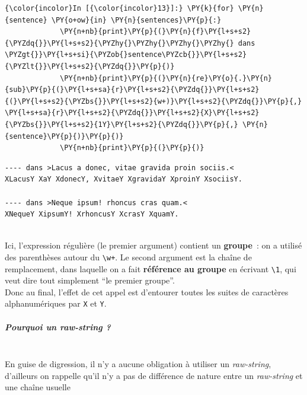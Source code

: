     \begin{Verbatim}[commandchars=\\\{\}]
{\color{incolor}In [{\color{incolor}13}]:} \PY{k}{for} \PY{n}{sentence} \PY{o+ow}{in} \PY{n}{sentences}\PY{p}{:}
             \PY{n+nb}{print}\PY{p}{(}\PY{n}{f}\PY{l+s+s2}{\PYZdq{}}\PY{l+s+s2}{\PYZhy{}\PYZhy{}\PYZhy{}\PYZhy{} dans \PYZgt{}}\PY{l+s+si}{\PYZob{}sentence\PYZcb{}}\PY{l+s+s2}{\PYZlt{}}\PY{l+s+s2}{\PYZdq{}}\PY{p}{)}
             \PY{n+nb}{print}\PY{p}{(}\PY{n}{re}\PY{o}{.}\PY{n}{sub}\PY{p}{(}\PY{l+s+sa}{r}\PY{l+s+s2}{\PYZdq{}}\PY{l+s+s2}{(}\PY{l+s+s2}{\PYZbs{}}\PY{l+s+s2}{w+)}\PY{l+s+s2}{\PYZdq{}}\PY{p}{,} \PY{l+s+sa}{r}\PY{l+s+s2}{\PYZdq{}}\PY{l+s+s2}{X}\PY{l+s+s2}{\PYZbs{}}\PY{l+s+s2}{1Y}\PY{l+s+s2}{\PYZdq{}}\PY{p}{,} \PY{n}{sentence}\PY{p}{)}\PY{p}{)}
             \PY{n+nb}{print}\PY{p}{(}\PY{p}{)}
\end{Verbatim}


    \begin{Verbatim}[commandchars=\\\{\}]
---- dans >Lacus a donec, vitae gravida proin sociis.<
XLacusY XaY XdonecY, XvitaeY XgravidaY XproinY XsociisY.

---- dans >Neque ipsum! rhoncus cras quam.<
XNequeY XipsumY! XrhoncusY XcrasY XquamY.


    \end{Verbatim}

    Ici, l'expression régulière (le premier argument) contient un
\textbf{groupe}~: on a utilisé des parenthèses autour du
\texttt{\textbackslash{}w+}. Le second argument est la chaîne de
remplacement, dans laquelle on a fait \textbf{référence au groupe} en
écrivant \texttt{\textbackslash{}1}, qui veut dire tout simplement ``le
premier groupe''.\\

Donc au final, l'effet de cet appel est d'entourer toutes les suites de
caractères alphanumériques par \texttt{X} et \texttt{Y}.

    \hypertarget{pourquoi-un-raw-string}{%
\subparagraph{\texorpdfstring{Pourquoi un \emph{raw-string}
?}{Pourquoi un raw-string ?}\\\\}\label{pourquoi-un-raw-string}}

    En guise de digression, il n'y a aucune obligation à utiliser un
\emph{raw-string}, d'ailleurs on rappelle qu'il n'y a pas de différence
de nature entre un \emph{raw-string} et une chaîne usuelle

